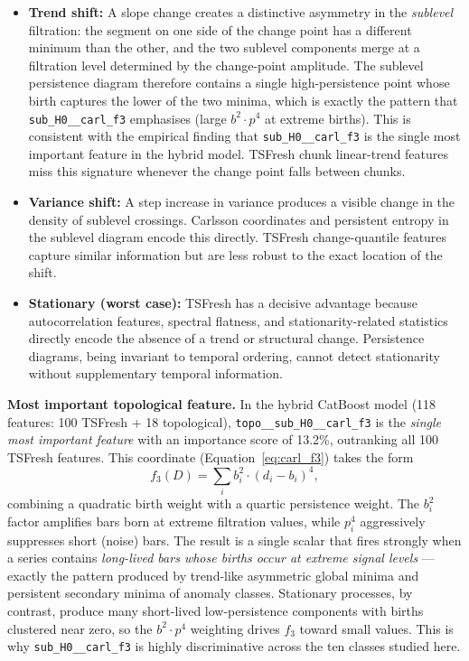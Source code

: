 \documentclass[12pt, a4paper]{article}
\theoremstyle{definition}
\theoremstyle{plain}
\begin{document}
\begin{itemize}
  \item \textbf{Trend shift:} A slope change creates a distinctive asymmetry in
    the \emph{sublevel} filtration: the segment on one side of the change point
    has a different minimum than the other, and the two sublevel components
    merge at a filtration level determined by the change-point amplitude. The
    sublevel persistence diagram therefore contains a single high-persistence
    point whose birth captures the lower of the two minima, which is exactly the
    pattern that \texttt{sub\_H0\_\_carl\_f3} emphasises (large $b^2 \cdot p^4$
    at extreme births). This is consistent with the empirical finding that
    \texttt{sub\_H0\_\_carl\_f3} is the single most important feature in the
    hybrid model. TSFresh chunk linear-trend features miss this signature
    whenever the change point falls between chunks.

  \item \textbf{Variance shift:} A step increase in variance produces a visible
    change in the density of sublevel crossings. Carlsson coordinates and persistent
    entropy in the sublevel diagram encode this directly. TSFresh change-quantile
    features capture similar information but are less robust to the exact location
    of the shift.

  \item \textbf{Stationary (worst case):} TSFresh has a decisive advantage because
    autocorrelation features, spectral flatness, and stationarity-related statistics
    directly encode the absence of a trend or structural change. Persistence diagrams,
    being invariant to temporal ordering, cannot detect stationarity without
    supplementary temporal information.
\end{itemize}

\medskip
\noindent
\textbf{Most important topological feature.}
In the hybrid CatBoost model (118 features: 100 TSFresh + 18 topological),
\texttt{topo\_\_sub\_H0\_\_carl\_f3} is the \emph{single most important feature}
with an importance score of 13.2\%, outranking all 100 TSFresh features.
This coordinate (Equation~\ref{eq:carl_f3}) takes the form
\[
  f_3(D) = \sum_i b_i^2 \cdot (d_i - b_i)^4,
\]
combining a quadratic birth weight with a quartic persistence weight. The
$b_i^2$ factor amplifies bars born at extreme filtration values, while $p_i^4$
aggressively suppresses short (noise) bars. The result is a single scalar that
fires strongly when a series contains \emph{long-lived bars whose births occur
at extreme signal levels} — exactly the pattern produced by trend-like
asymmetric global minima and persistent secondary minima of anomaly classes.
Stationary processes, by contrast, produce many short-lived
low-persistence components with births clustered near zero, so the $b^2 \cdot
p^4$ weighting drives $f_3$ toward small values. This is why
\texttt{sub\_H0\_\_carl\_f3} is highly discriminative across the ten classes
studied here.
\end{document}
